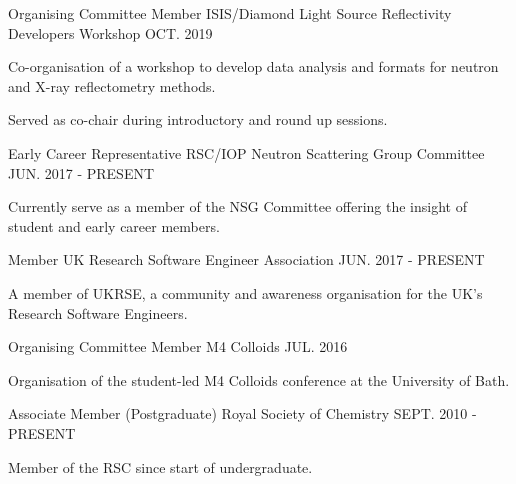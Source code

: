 \begin{cventries}
  \cventry
    {Organising Committee Member}
    {ISIS/Diamond Light Source Reflectivity Developers Workshop}
    {}
    {OCT. 2019}
    {
      \begin{cvitems}
        \item{Co-organisation of a workshop to develop data analysis and formats for neutron and X-ray reflectometry methods.}
        \item{Served as co-chair during introductory and round up sessions.}
      \end{cvitems}
    }
  \cventry
  	{Early Career Representative}
    {RSC/IOP Neutron Scattering Group Committee}
    {}
    {JUN. 2017 - PRESENT}
    {
      \begin{cvitems}
      	\item{Currently serve as a member of the NSG Committee offering the insight of student and early career members.}
	  \end{cvitems}
	}
  \cventry
    {Member}
    {UK Research Software Engineer Association}
    {}
    {JUN. 2017 - PRESENT}
    {
	  \begin{cvitems}
	  	\item{A member of UKRSE, a community and awareness organisation for the UK's Research Software Engineers.}
	  \end{cvitems}
    }
  \cventry
    {Organising Committee Member}
    {M4 Colloids}
    {}
    {JUL. 2016}
    {
      \begin{cvitems}
        \item{Organisation of the student-led M4 Colloids conference at the University of Bath.}
      \end{cvitems}
    }
  \cventry
    {Associate Member (Postgraduate)}
    {Royal Society of Chemistry}
    {}
    {SEPT. 2010 - PRESENT}
    {
      \begin{cvitems}
      	\item{Member of the RSC since start of undergraduate.}
      \end{cvitems}
    }
\end{cventries}
